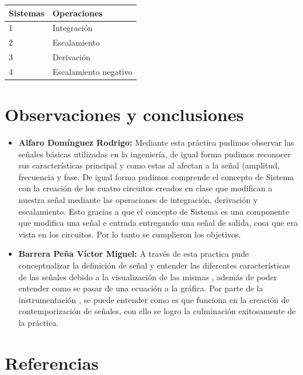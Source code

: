 \begin{tabular}{|l|l|}
	\hline
	Sistemas & Operaciones  \\
	\hline
	1 & Integración \\
	\hline
	2 & Escalamiento \\
	\hline
	3 & Derivación \\
	\hline
	4 &  Escalamiento negativo\\
	\hline
\end{tabular}


\section*{Observaciones y conclusiones}
\begin{itemize}
	\item \textbf{Alfaro Domínguez Rodrigo:} Mediante esta práctica pudimos observar las señales básicas utilizadas en la ingeniería, de igual forma pudimos reconocer sus características principal y como estas al afectan a la señal (amplitud, frecuencia y fase. De igual forma pudimos comprende el concepto de Sistema con la creación de los cuatro circuitos creados en clase que modifican a nuestra señal mediante las operaciones de integración, derivación y escalamiento. Esto gracias a que el concepto de Sistema es una componente que modifica una señal e entrada entregando una señal de salida, cosa que era vista en los circuitos. Por lo tanto se cumplieron los objetivos.
	\item \textbf{Barrera Peña Víctor Miguel:} A través de esta practica pude conceptualizar  la definición de señal y entender las diferentes características de las señales debido a la visualización de las mismas , además de poder entender como se pasar de una ecuación a la gráfica. Por parte de la instrumentación , se puede entender como es que funciona en la creación de contemporización de señales, con ello se logro la culminación exitosamente de la práctica.
\end{itemize}


\section*{Referencias}

